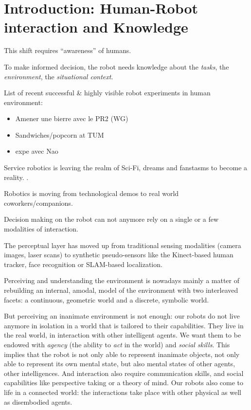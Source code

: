 \chapter{Introduction: Human-Robot interaction and Knowledge}
\label{chapter|introduction}


This shift requires ``awareness'' of humans.

To make informed decision, the robot needs knowledge about the \emph{tasks},
the \emph{environment}, the \emph{situational context}.

List of recent successful \& highly visible robot experiments in human environment:
\begin{itemize}
    \item Amener une bierre avec le PR2 (WG)
    \item Sandwiches/popcorn at TUM
    \item expe avec Nao
\end{itemize}

Service robotics is leaving the realm of Sci-Fi, dreams and fanstasms to become
a reality. . 

Robotics is moving from technological demos to real world coworkers/companions.


Decision making on the robot can not anymore rely on a single or a few
modalities of interaction.

The perceptual layer has moved up from traditional sensing modalities (camera
images, laser scans) to synthetic pseudo-sensors like the Kinect-based human
tracker, face recognition or SLAM-based localization.

Perceiving and understanding the environment is nowadays mainly a matter of
rebuilding an internal, amodal, model of the environment with two interleaved
facets: a continuous, geometric world and a discrete, symbolic world.

But perceiving an inanimate environment is not enough: our robots do not live
anymore in isolation in a world that is tailored to their capabilities. They
live in the real world, in interaction with other intelligent agents. We want
them to be endowed with \emph{agency} (the ability to \emph{act} in the world)
and \emph{social skills}. This implies that the robot is not only able to
represent inanimate objects, not only able to represent its own mental state,
but also mental states of other agents, other intelligences. And interaction
also require communication skills, and social capabilities like perspective
taking or a theory of mind. Our robots also come to life in a connected world:
the interactions take place with other physical as well as disembodied agents.

